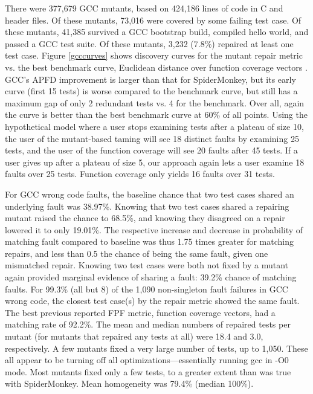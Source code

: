 There were 377,679 GCC mutants, based on 424,186 lines of code in C and header files. Of these mutants, 73,016 were covered by some failing test case.  Of these mutants, 41,385 survived a GCC bootstrap build, compiled hello world, and passed a GCC test suite.  Of these mutants, 3,232 (7.8\%) repaired at least one test case.  Figure \ref{gcccurves} shows discovery curves for the mutant repair metric vs. the best benchmark curve, Euclidean distance over function coverage vectors \cite{PLDI13}.  GCC's APFD improvement is larger than that for SpiderMonkey, but its early curve (first 15 tests) is worse compared to the benchmark curve, but still has a maximum gap of only 2 redundant tests vs. 4 for the benchmark.  Over all, again the curve is better than the best benchmark curve at 60\% of all points.  Using the hypothetical model where a user stops examining tests after a plateau of size 10, the user of the mutant-based taming will see 18 distinct faults by examining 25 tests, and the user of the function coverage will see 20 faults after 45 tests.  If a user gives up after a plateau of size 5, our approach again lets a user examine 18 faults over 25 tests.  Function coverage only yields 16 faults over 31 tests. 


For GCC wrong code faults, the baseline chance that two test cases shared an underlying fault was 38.97\%.  Knowing that two test cases shared a repairing mutant raised the chance to 68.5\%, and knowing they disagreed on a repair lowered it to only 19.01\%.  The respective increase and decrease in probability of matching fault compared to baseline was thus 1.75 times greater for matching repairs, and less than 0.5 the chance of being the same fault, given one mismatched repair.  Knowing two test cases were both not fixed by a mutant again provided marginal evidence of sharing a fault: 39.2\% chance of matching faults.
For 99.3\% (all but 8) of the 1,090 non-singleton fault failures in GCC wrong code, the closest test case(s) by the repair metric showed the same fault.  The best previous reported FPF metric, function coverage vectors, had a matching rate of 92.2\%.   The mean and median numbers of repaired tests per mutant (for mutants that repaired any tests at all) were 18.4 and 3.0, respectively.  A few mutants fixed a very large number of tests, up to 1,050.  These all appear to be turning off all optimizations---essentially running gcc in -O0 mode.  Most mutants fixed only a few tests, to a greater extent than was true with SpiderMonkey.    Mean homogeneity was 79.4\% (median 100\%).

